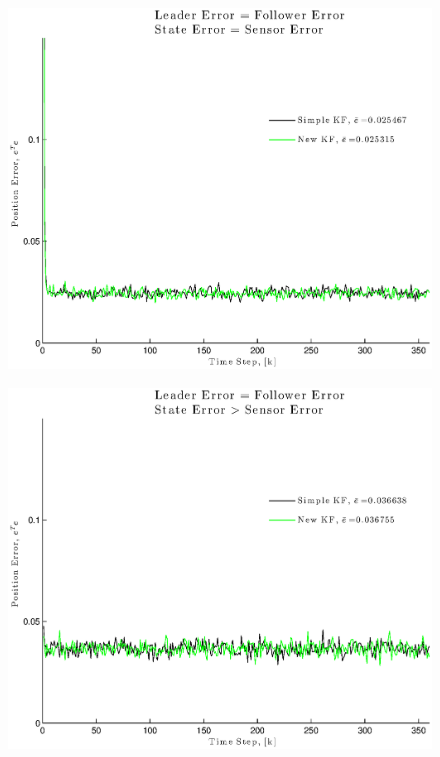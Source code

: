 \documentclass[11pt]{article}
\begin{document}
\begin{figure}[!hbtp]
\centering
\includegraphics[scale=0.7]{fig1}
\end{figure}
\begin{figure}[!hbtp]
\centering
\includegraphics[scale=0.7]{fig2}
\end{figure}
\end{document}
